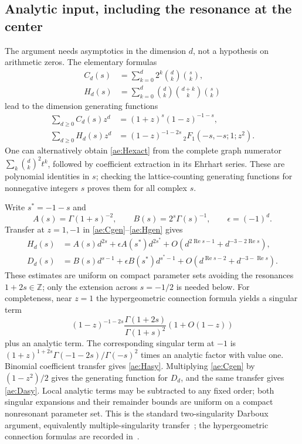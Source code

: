 \subsection{Analytic input, including the resonance at the center}
The argument needs asymptotics in the dimension $d$, not a hypothesis on
arithmetic zeros. The elementary formulas
\begin{align}
 C_d(s)&=\sum_{k=0}^d 2^k\binom dk\binom sk,\label{ae:Cexact}\\
 H_d(s)&=\sum_{k=0}^d\binom dk\binom{d+k}k\binom sk\label{ae:Hexact}
\end{align}
lead to the dimension generating functions
\begin{align}
 \sum_{d\ge0}C_d(s)z^d
  &=(1+z)^s(1-z)^{-1-s},\label{ae:Cgen}\\
 \sum_{d\ge0}H_d(s)z^d
  &=(1-z)^{-1-2s}\,{}_2F_1(-s,-s;1;z^2).\label{ae:Hgen}
\end{align}
One can alternatively obtain \eqref{ae:Hexact} from the complete graph
numerator $\sum_k\binom dk^2 t^k$, followed by coefficient extraction in
its Ehrhart series. These are polynomial identities in $s$; checking the
lattice-counting generating functions for nonnegative integers $s$ proves
them for all complex $s$.

Write $s^*=-1-s$ and
\[
 A(s)=\Gamma(1+s)^{-2},\qquad B(s)=2^s\Gamma(s)^{-1},
 \qquad \epsilon=(-1)^d.
\]
Transfer at $z=1,-1$ in \eqref{ae:Cgen}--\eqref{ae:Hgen} gives
\begin{align}
 H_d(s)&=A(s)d^{2s}+\epsilon A(s^*)d^{2s^*}
             +O(d^{2\operatorname{Re}s-1}+d^{-3-2\operatorname{Re}s}),
 \label{ae:Hasy}\\
 D_d(s)&=B(s)d^{s-1}+\epsilon B(s^*)d^{s^*-1}
             +O(d^{\operatorname{Re}s-2}+d^{-3-\operatorname{Re}s}).
 \label{ae:Dasy}
\end{align}
These estimates are uniform on compact parameter sets avoiding the
resonances $1+2s\in\mathbb Z$; only the extension across $s=-1/2$ is
needed below. For completeness, near $z=1$ the hypergeometric connection
formula yields a singular term
\[
 (1-z)^{-1-2s}\frac{\Gamma(1+2s)}{\Gamma(1+s)^2}
                      (1+O(1-z))
\]
plus an analytic term. The corresponding singular term at $-1$ is
$(1+z)^{1+2s}\Gamma(-1-2s)/\Gamma(-s)^2$ times an analytic factor
with value one. Binomial coefficient transfer gives \eqref{ae:Hasy}.
Multiplying \eqref{ae:Cgen} by $(1-z^2)/2$ gives the generating function
for $D_d$, and the same transfer gives \eqref{ae:Dasy}. Local analytic
terms may be subtracted to any fixed order; both singular expansions and
their remainder bounds are uniform on a compact nonresonant parameter
set. This is the standard two-singularity Darboux argument, equivalently
multiple-singularity transfer~\cite[Chapter VI]{FS2009}; the hypergeometric
connection formulas are recorded in~\cite[Section 15.8]{DLMF}.

